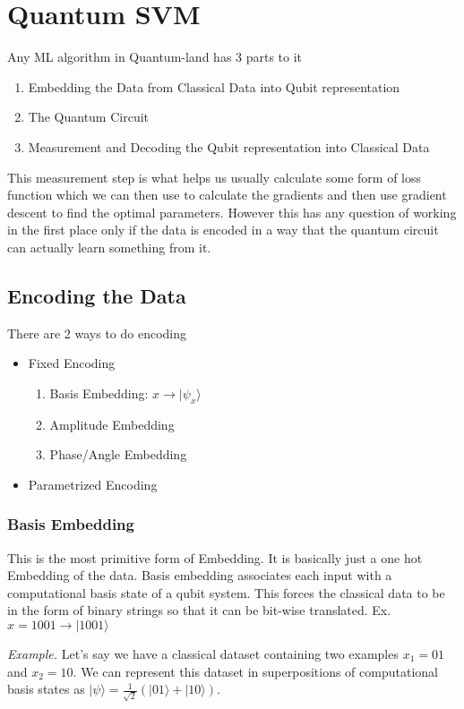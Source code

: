 \documentclass[hidelinks]{book}
\numberwithin{equation}{section}
\begin{document}
\section{Quantum SVM}
Any ML algorithm in Quantum-land has 3 parts to it
\begin{enumerate}
  \item Embedding the Data from Classical Data into Qubit representation
  \item The Quantum Circuit
  \item Measurement and Decoding the Qubit representation into Classical Data
\end{enumerate}

This measurement step is what helps us usually calculate some form of loss function
which we can then use to calculate the gradients and then use gradient descent to
find the optimal parameters. However this has any question of working in the first
place only if the data is encoded in a way that the quantum circuit can actually
learn something from it.

\subsection{Encoding the Data}
There are 2 ways to do encoding
\begin{itemize}
  \item Fixed Encoding
    \begin{enumerate}
    \item Basis Embedding: $x \rightarrow |\psi_x\rangle$
    \item Amplitude Embedding
    \item Phase/Angle Embedding
    \end{enumerate}
  \item Parametrized Encoding
\end{itemize}

\subsubsection{Basis Embedding}
This is the most primitive form of Embedding. It is basically just a one hot
Embedding of the data. Basis embedding associates each input with a computational basis state of a qubit system.
This forces the classical data to be in the form of binary strings so that it can be
bit-wise translated. Ex. $x = 1001 \rightarrow |1001\rangle$

\textit{Example.} Let's say we have a classical dataset containing two examples $x_1 = 01 $ and $x_2 = 10$. We can represent this dataset in superpositions of computational basis states as $|\psi\rangle = \frac{1}{\sqrt{2}}(|01\rangle + |10\rangle)$.
\end{document}
